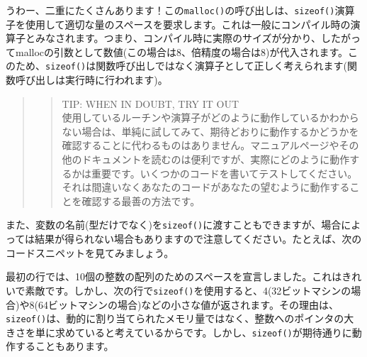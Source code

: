 \begin{Shaded}
\begin{Highlighting}[]
\NormalTok{(}\NormalTok{));}
\end{Highlighting}
\end{Shaded}

うわー、二重にたくさんあります！この\texttt{malloc()}の呼び出しは、\texttt{sizeof()}演算子を使用して適切な量のスペースを要求します。これは一般にコンパイル時の演算子とみなされます。つまり、コンパイル時に実際のサイズが分かり、したがってmallocの引数として数値(この場合は8、倍精度の場合は8)が代入されます。このため、\texttt{sizeof()}は関数呼び出しではなく演算子として正しく考えられます(関数呼び出しは実行時に行われます)。

\begin{quote}
\begin{quote}
TIP: WHEN IN DOUBT, TRY IT OUT\\
使用しているルーチンや演算子がどのように動作しているかわからない場合は、単純に試してみて、期待どおりに動作するかどうかを確認することに代わるものはありません。マニュアルページやその他のドキュメントを読むのは便利ですが、実際にどのように動作するかは重要です。いくつかのコードを書いてテストしてください。それは間違いなくあなたのコードがあなたの望むように動作することを確認する最善の方法です。
\end{quote}
\end{quote}

また、変数の名前(型だけでなく)を\texttt{sizeof()}に渡すこともできますが、場合によっては結果が得られない場合もありますので注意してください。たとえば、次のコードスニペットを見てみましょう。

\begin{Shaded}
\begin{Highlighting}[]
\NormalTok{ * }\NormalTok{(}\NormalTok{));}
\NormalTok{, }
\end{Highlighting}
\end{Shaded}

最初の行では、10個の整数の配列のためのスペースを宣言しました。これはきれいで素敵です。しかし、次の行で\texttt{sizeof()}を使用すると、4(32ビットマシンの場合)や8(64ビットマシンの場合)などの小さな値が返されます。その理由は、\texttt{sizeof()}は、動的に割り当てられたメモリ量ではなく、整数へのポインタの大きさを単に求めていると考えているからです。しかし、\texttt{sizeof()}が期待通りに動作することもあります。

